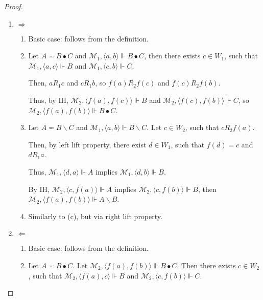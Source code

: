 \documentclass[a4paper]{article}
\theoremstyle{defin}
\theoremstyle{theorem}
\theoremstyle{prop}
\theoremstyle{lemma}
\theoremstyle{ex}
\theoremstyle{col}
\begin{document}
\begin{proof}
$ $

  \begin{enumerate}
    \item $\Rightarrow$
      \begin{enumerate}
        \item Basic case: follows from the definition.
        \item Let $A \eqcirc B \bullet C$ and $\mathcal{M}_1, \langle a, b \rangle \Vdash B \bullet C$, then
        there exists $c \in W_1$, such that $\mathcal{M}_1, \langle a, c \rangle \Vdash B$ and
        $\mathcal{M}_1, \langle c, b \rangle \Vdash C$.

        Then, $a R_1 c$ and $c R_1 b$, so $f(a) R_2 f(c)$ and $f(c) R_2 f(b)$.

        Thus, by IH, $\mathcal{M}_2, \langle f(a), f(c) \rangle \Vdash B$ and
        $\mathcal{M}_2, \langle f(c), f(b) \rangle \Vdash C$, so $\mathcal{M}_2, \langle f(a), f(b) \rangle \Vdash B \bullet C$.
        \item Let $A \eqcirc B \backslash C$ and $\mathcal{M}_1, \langle a, b \rangle \Vdash B \backslash C$.
        Let $c \in W_2$, such that $c R_2 f(a)$.

        Then, by left lift property, there exist $d \in W_1$, such that $f(d) = c$ and $d R_1 a$.

        Thus, $\mathcal{M}_1, \langle d, a \rangle \Vdash A$ implies
        $\mathcal{M}_1, \langle d, b \rangle \Vdash B$.

        By IH, $\mathcal{M}_2, \langle c, f(a) \rangle \Vdash A$ implies
        $\mathcal{M}_2, \langle c, f(b) \rangle \Vdash B$, then $\mathcal{M}_2, \langle f(a), f(b) \rangle \Vdash A \backslash B$.

        \item Similarly to (c), but via right lift property.
      \end{enumerate}
    \item $\Leftarrow$
    \begin{enumerate}
      \item Basic case: follows from the definition.

      \item Let $A \eqcirc B \bullet C$.
      Let $\mathcal{M}_2, \langle f(a), f(b) \rangle \Vdash B \bullet C$. Then
      there exists $c \in W_2$, such that $\mathcal{M}_2, \langle f(a), c \rangle \Vdash B$ and
      $\mathcal{M}_2, \langle c, f(b) \rangle \Vdash C$.


\end{enumerate}
\end{enumerate}
\end{proof}
\end{document}
